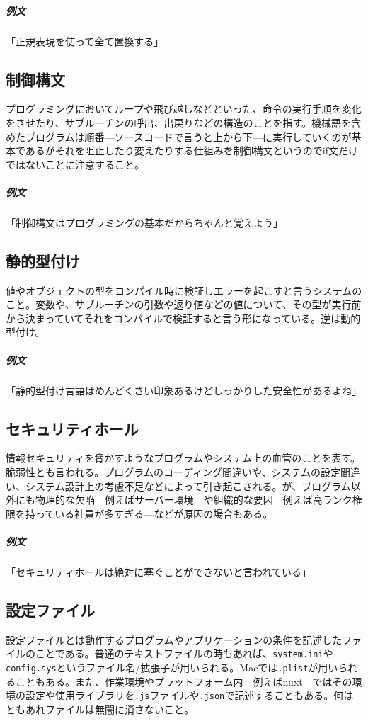 \documentclass[dvipdfmx,jb5]{jreport}
\newcommand{\terlogy}[2][|]{\colorbox{terlogy}{\texttt{\lstinline#1#2#1}}}
\begin{document}
\subparagraph{例文}「正規表現を使って全て置換する」

\subsection{制御構文}
プログラミングにおいてループや飛び越しなどといった、命令の実行手順を変化をさせたり、サブルーチンの呼出、出戻りなどの構造のことを指す。機械語を含めたプログラムは順番---ソースコードで言うと上から下---に実行していくのが基本であるがそれを阻止したり変えたりする仕組みを制御構文というのでif文だけではないことに注意すること。

\subparagraph{例文}「制御構文はプログラミングの基本だからちゃんと覚えよう」

\subsection{静的型付け}
値やオブジェクトの型をコンパイル時に検証しエラーを起こすと言うシステムのこと。変数や、サブルーチンの引数や返り値などの値について、その型が実行前から決まっていてそれをコンパイルで検証すると言う形になっている。逆は動的型付け。

\subparagraph{例文}「静的型付け言語はめんどくさい印象あるけどしっかりした安全性があるよね」

\subsection{セキュリティホール}
情報セキュリティを脅かすようなプログラムやシステム上の血管のことを表す。脆弱性とも言われる。プログラムのコーディング間違いや、システムの設定間違い、システム設計上の考慮不足などによって引き起こされる。が、プログラム以外にも物理的な欠陥---例えばサーバー環境---や組織的な要因---例えば高ランク権限を持っている社員が多すぎる---などが原因の場合もある。

\subparagraph{例文}「セキュリティホールは絶対に塞ぐことができないと言われている」

\subsection{設定ファイル}
設定ファイルとは動作するプログラムやアプリケーションの条件を記述したファイルのことである。普通のテキストファイルの時もあれば、\terlogy{system.ini}や\terlogy{config.sys}というファイル名/拡張子が用いられる。Macでは\terlogy{.plist}が用いられることもある。また、作業環境やプラットフォーム内---例えばnuxt---ではその環境の設定や使用ライブラリを\terlogy{.js}ファイルや\terlogy{.json}で記述することもある。何はともあれファイルは無闇に消さないこと。
\end{document}
